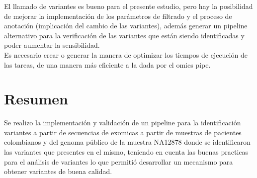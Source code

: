 El llamado de variantes es bueno para el presente estudio, pero hay la posibilidad de mejorar la implementación de los parámetros de filtrado y el proceso de anotación (implicación del cambio de las variantes), además generar un pipeline alternativo para la verificación de las variantes que están siendo identificadas y poder aumentar la sensibilidad. \\

Es necesario crear o generar la manera de optimizar los tiempos de ejecución de las tareas, de una manera más eficiente a la dada por el omics pipe.

\section*{Resumen}

Se realizo la implementación y validación de un pipeline para la identificación variantes a partir de secuencias de exomicas a partir de muestras de pacientes colombianos y del genoma público de la muestra NA12878 donde se identificaron las variantes que presentes en el mismo, teniendo en cuenta las buenas practicas para el análisis de variantes lo que permitió desarrollar un mecanismo para obtener variantes de buena calidad.